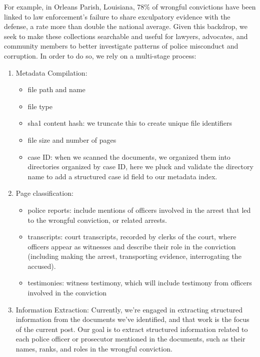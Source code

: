 \documentclass{article}
\begin{document}
For example, in Orleans Parish, Louisiana, 78\% of wrongful convictions have been linked to law enforcement's failure to share exculpatory evidence with the defense, a rate more than double the national average. Given this backdrop, we seek to make these collections searchable and useful for lawyers, advocates, and community members to better investigate patterns of police misconduct and corruption. In order to do so, we rely on a multi-stage process:

\begin{enumerate}
    \item Metadata Compilation:
    \begin{itemize}
        \item file path and name
        \item file type
        \item sha1 content hash: we truncate this to create unique file identifiers
        \item file size and number of pages
        \item case ID: when we scanned the documents, we organized them into directories organized by case ID, here we pluck and validate the directory name to add a structured case id field to our metadata index.
    \end{itemize}
    
    \item Page classification:
    \begin{itemize}
        \item police reports: include mentions of officers involved in the arrest that led to the wrongful conviction, or related arrests.
        \item transcripts: court transcripts, recorded by clerks of the court, where officers appear as witnesses and describe their role in the conviction (including making the arrest, transporting evidence, interrogating the accused).
        \item testimonies: witness testimony, which will include testimony from officers involved in the conviction
    \end{itemize}
    
    \item Information Extraction: Currently, we're engaged in extracting structured information from the documents we've identified, and that work is the focus of the current post. Our goal is to extract structured information related to each police officer or prosecutor mentioned in the documents, such as their names, ranks, and roles in the wrongful conviction.


\end{enumerate}
\end{document}
